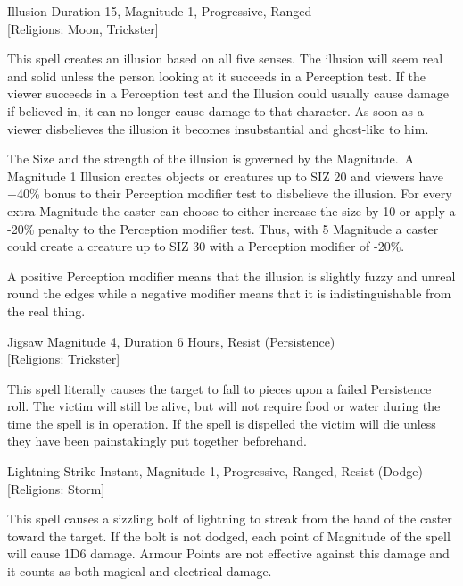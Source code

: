 \begin{samepage}
\begin{rpg-spell}
{Illusion}
{Duration 15, Magnitude 1, Progressive, Ranged\\{[Religions: Moon, Trickster]}}

This spell creates an illusion based on all five senses. The illusion will seem real and solid unless the person looking at it succeeds in a Perception test. If the viewer succeeds in a Perception test and the Illusion could usually cause damage if believed in, it can no longer cause damage to that character. As soon as a viewer disbelieves the illusion it becomes insubstantial and ghost-like to him.

The Size and the strength of the illusion is governed by the Magnitude. A Magnitude 1 Illusion creates objects or creatures up to SIZ 20 and viewers have +40\% bonus to their Perception modifier test to disbelieve the illusion. For every extra Magnitude the caster can choose to either increase the size by 10 or apply a -20\% penalty to the Perception modifier test. Thus, with 5 Magnitude a caster could create a creature up to SIZ 30 with a Perception modifier of -20\%.
    
A positive Perception modifier means that the illusion is slightly fuzzy and unreal round the edges while a negative modifier means that it is indistinguishable from the real thing.
\end{rpg-spell}
\end{samepage}

\begin{samepage}
\begin{rpg-spell}
{Jigsaw}
{Magnitude 4, Duration 6 Hours, Resist (Persistence)\\{[Religions: Trickster]}}

This spell literally causes the target to fall to pieces upon a failed Persistence roll. The victim will still be alive, but will not require food or water during the time the spell is in operation. If the spell is dispelled the victim will die unless they have been painstakingly put together beforehand. 
\end{rpg-spell}
\end{samepage}

\begin{samepage}
\begin{rpg-spell}
{Lightning Strike}
{Instant, Magnitude 1, Progressive, Ranged, Resist (Dodge)\\{[Religions: Storm]}}

This spell causes a sizzling bolt of lightning to streak from the hand of the caster toward the target. If the bolt is not dodged, each point of Magnitude of the spell will cause 1D6 damage. Armour Points are not effective against this damage and it counts as both magical and electrical damage.
\end{rpg-spell}
\end{samepage}

